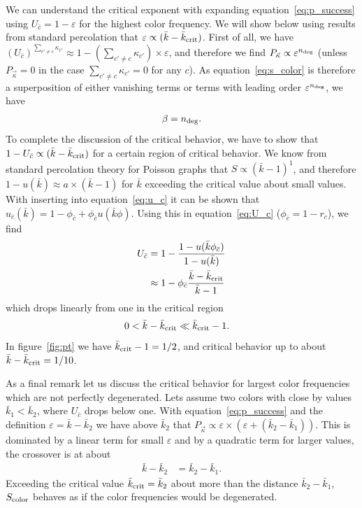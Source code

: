 \documentclass[aps, pre, onecolumn, a4paper, floatfix]{revtex4}
\begin{document}
We can understand the critical exponent with expanding equation~\ref{eq:p_success} using 
$U_{\bar c}=1-\varepsilon$ for the highest color frequency. 
We will show below using results from standard percolation that 
$\varepsilon\propto ({\bar k}-{\bar k}_{\rm crit})$. First of all, we have 
$(U_{\bar c})^{\sum_{c'\neq c} \kappa_{c'} }\approx 1-({\sum_{c'\neq c} \kappa_{c'} })\times \varepsilon$, and therefore we find 
$P_{\vec \kappa} \propto \varepsilon^{n_{\rm deg}}$ (unless $P_{\vec \kappa} = 0$ in the case ${\sum_{c'\neq c} \kappa_{c'} }=0$
for any $c$). As equation~\ref{eq:s_color} is therefore a superposition of either vanishing terms or terms with 
leading order $\varepsilon^{n_{\rm deg}}$, we have 
\begin{align}
\beta=n_{\rm deg}.
\end{align}
To complete the discussion of the critical behavior, we have to show that 
$1- U_{\bar c}\propto ({\bar k}-{\bar k}_{\rm crit})$ for a certain region of critical behavior. 
We know from standard percolation theory for Poisson graphs that $S \propto ({\bar k}-1)^1$, and therefore 
$1-u({\bar k})\approx a \times ({\bar k}-1)$ for $\bar k$ exceeding the critical value 
about small values. With inserting into equation~\ref{eq:u_c} it can be shown that 
$u_{\bar c}({\bar k})=1-\phi_{\bar c}+\phi_{\bar c}u({\bar k}\phi)$. Using this in 
equation~\ref{eq:U_c} ($\phi_{\bar c}=1-r_c$), we find 
\begin{align}
U_{\bar c} &= 1 - \frac{1-u({\bar k}\phi_{\bar c})}{1-u({\bar k})}\\
&\approx 1- \phi_{\bar c} \frac{{\bar k}-{\bar k}_{\rm crit}}{{\bar k}-1}
\end{align}
which drops linearly from one in the critical region
\begin{align}
0< {\bar k}-{\bar k}_{\rm crit} &\ll {\bar k}_{\rm crit}-1.
\end{align}
In figure~\ref{fig:pt} we have ${\bar k}_{\rm crit}-1=1/2$, and critical behavior up to 
about ${\bar k}-{\bar k}_{\rm crit}=1/10$.

As a final remark let us discuss the critical behavior for largest color frequencies which 
are not perfectly degenerated. Lets assume two colors with close by values 
${\bar k}_1< {\bar k}_2$, where $U_{\bar c}$ drops below one. With equation~\ref{eq:p_success} and the definition 
$\varepsilon={\bar k}-{\bar k}_2$ we have above ${\bar k}_2$ that 
$P_{\vec \kappa} \propto \varepsilon \times (\varepsilon+({\bar k}_2 - {\bar k}_1))$. This 
is dominated by a linear term for small $\varepsilon$ and by a quadratic term for larger 
values, the crossover is at about
\begin{align}
{\bar k}-{\bar k}_2 &= {\bar k}_2-{\bar k}_1.
\end{align}
Exceeding the critical value ${\bar k}_{\rm crit}={\bar k}_2$ about more than the 
distance ${\bar k}_2 - {\bar k}_1$, $S_{\rm color}$ behaves as 
if the color frequencies would be degenerated. 
\end{document}
